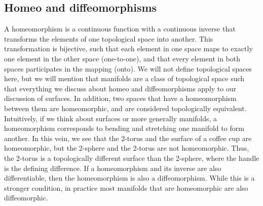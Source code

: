 \begin{appendices}
\section{Homeo and diffeomorphisms}
A homeomorphism is a continuous function with a continuous inverse that transforms the elements of one topological space into another. This transformation is bijective, such that each element in one space maps to exactly one element in the other space (one-to-one), and that every element in both spaces participates in the mapping (onto).
We will not define topological spaces here, but we will mention that manifolds are a class of topological space such that everything we discuss about homeo and diffeomorphisms apply to our discussion of surfaces.
In addition, two spaces that have a homeomorphism between them are homeomorphic, and are considered topologically equivalent. \\

Intuitively, if we think about surfaces or more generally manifolds, a homeomorphism corresponds to bending and stretching one manifold to form another.
In this vein, we see that the 2-torus and the surface of a coffee cup are homeomorphic, but the 2-sphere and the 2-torus are not homeomorphic.
Thus, the 2-torus is a topologically different surface than the 2-sphere, where the handle is the defining difference.
If a homeomorphism and its inverse are also differentiable, then the homeomorphism is also a diffeomorphism.
While this is a stronger condition, in practice most manifolds that are homeomorphic are also diffeomorphic.




\end{appendices}
